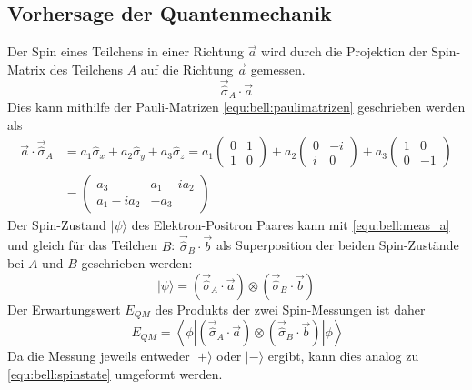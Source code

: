 \begin{refsection}
\subsection{Vorhersage der Quantenmechanik}
Der Spin eines Teilchens in einer Richtung $\vec{a}$ wird durch die Projektion
der Spin-Matrix des Teilchens $A$ auf die Richtung $\vec{a}$ gemessen.
\begin{equation}\label{equ:bell:meas_a}
    \vec{\hat{\sigma}}_A \cdot \vec{a}
\end{equation}
Dies kann mithilfe der Pauli-Matrizen \eqref{equ:bell:paulimatrizen} geschrieben
werden als
\begin{align}
    \vec{a} \cdot \vec{\hat{\sigma}}_A &= 
    a_1 \hat{\sigma}_x + a_2 \hat{\sigma}_y + a_3 \hat{\sigma}_z = 
    a_1 \begin{pmatrix} 0 & 1 \\ 1 & 0 \end{pmatrix} +
    a_2 \begin{pmatrix} 0 & -i \\ i & 0 \end{pmatrix} + 
    a_3 \begin{pmatrix} 1 & 0 \\ 0 & -1 \end{pmatrix} \\
    & = \begin{pmatrix}
       a_3 & a_1 - i a_2 \\
       a_1 - i a_2 & -a_3
    \end{pmatrix} \label{equ:bell:proj_a_s}
\end{align}
Der Spin-Zustand $|\psi\rangle$ des Elektron-Positron Paares kann mit
\eqref{equ:bell:meas_a} und gleich f\"ur das Teilchen $B$: 
$\vec{\hat{\sigma}}_B \cdot \vec{b}$ als Superposition der beiden
Spin-Zust\"ande bei $A$ und $B$ geschrieben werden:
\begin{equation}
    |\psi\rangle = \left( \vec{\hat{\sigma}}_A \cdot \vec{a} \right)
        \otimes \left( \vec{\hat{\sigma}}_B \cdot \vec{b} \right)
\end{equation}
Der Erwartungswert $E_{QM}$ des Produkts der zwei Spin-Messungen
ist daher
\begin{equation}\
    E_{QM} = \left\langle \phi \left| 
    \left( \vec{\hat{\sigma}}_A \cdot \vec{a} \right)
            \otimes \left( \vec{\hat{\sigma}}_B \cdot \vec{b} \right)
    \right| \phi \right\rangle
\end{equation}
Da die Messung jeweils entweder $|+\rangle$ oder $|-\rangle$ ergibt, kann
dies analog zu \eqref{equ:bell:spinstate} umgeformt werden.

\end{refsection}
